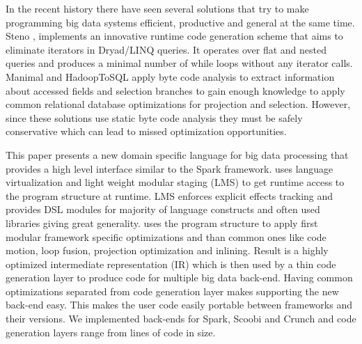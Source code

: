 In the recent history there have seen several solutions that try to make programming big data systems efficient, productive and general at the same time. Steno \cite{murray_steno:_2011}, implements an innovative runtime code generation scheme that aims to eliminate iterators in Dryad/LINQ queries. It operates over flat and nested queries and produces a minimal number of while loops without any iterator calls. Manimal \cite{jahani_automatic_2011} and HadoopToSQL \cite{iu_hadooptosql:_2010} apply byte code analysis to extract information about accessed fields and selection branches to gain enough knowledge to apply common relational database optimizations for projection and selection. However, since these solutions use static byte code analysis they must be safely conservative which can lead to missed optimization opportunities.         

This paper presents a new domain specific language \tool for big data processing that provides a high level interface similar to the Spark framework. \tool uses language virtualization \cite{moors_scala-virtualized_2012} and light weight modular staging (LMS)\cite{rompf_lightweight_2010} to get runtime access to the program structure at runtime. LMS enforces explicit effects tracking and provides DSL modules for majority of language constructs and often used libraries giving \tool great generality. \tool uses the program structure to apply first modular framework specific optimizations and than common ones like code motion, loop fusion, projection optimization and inlining. Result is a highly optimized intermediate representation (IR) which is then used by a thin code generation layer to produce code for multiple big data back-end. Having common optimizations separated from code generation layer makes supporting the new back-end  easy. This makes the user code easily portable between frameworks and their versions. We implemented back-ends for Spark, Scoobi \cite{nicta_scoobi_2012} and Crunch \cite{_crunch_2012} and code generation layers range from  lines of code in size. 



